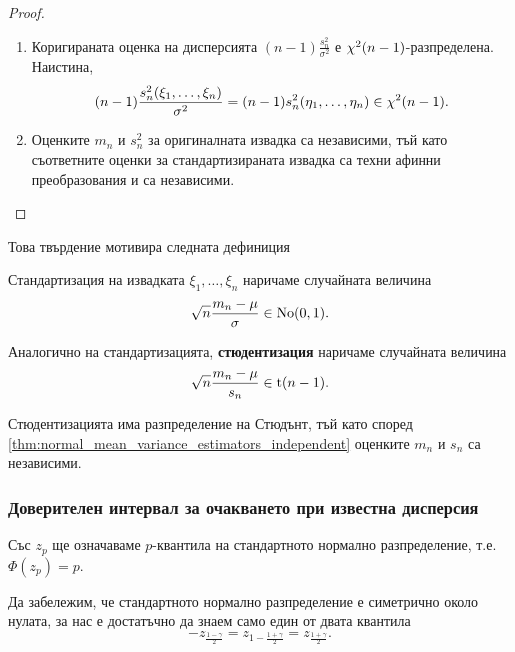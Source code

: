 \documentclass[
  numbers=endperiod,
  headings=standardclasses,
  bibliography=totocnumbered,
]{scrartcl}
\begin{document}
\begin{proof}
\begin{enumerate}
    \item Коригираната оценка на дисперсията \( (n-1) \frac {s_n^2} {\sigma^2} \) е \( \chi^2(n-1) \)-разпределена. Наистина,
    \begin{equation*}
      (n-1) \frac {s_n^2(\xi_1, \ldots, \xi_n)} {\sigma^2}
      =
      (n-1) s_n^2(\eta_1, \ldots, \eta_n)
      \in
      \chi^2(n - 1).
    \end{equation*}

    \item Оценките \( m_n \) и \( s_n^2 \) за оригиналната извадка са независими, тъй като съответните оценки за стандартизираната извадка са техни афинни преобразования и са независими.
  \end{enumerate}
\end{proof}

Това твърдение мотивира следната дефиниция
\begin{definition}
  Стандартизация на извадката \( \xi_1, \ldots, \xi_n \) наричаме случайната величина
  \begin{equation*}
    \sqrt n \frac {m_n - \mu} \sigma \in \operatorname{No}(0, 1).
  \end{equation*}

  Аналогично на стандартизацията, \textbf{стюдентизация} наричаме случайната величина
  \begin{equation*}
    \sqrt n \frac {m_n - \mu} {s_n} \in \operatorname{t}(n - 1).
  \end{equation*}
\end{definition}

\begin{remark}
  Стюдентизацията има разпределение на Стюдънт, тъй като според \cref{thm:normal_mean_variance_estimators_independent} оценките \( m_n \) и \( s_n \) са независими.
\end{remark}

\subsubsection{Доверителен интервал за очакването при известна дисперсия}

Със \( z_p \) ще означаваме \( p \)-квантила на стандартното нормално разпределение, т.е. \( \Phi(z_p) = p \).

Да забележим, че стандартното нормално разпределение е симетрично около нулата, за нас е достатъчно да знаем само един от двата квантила
\begin{equation*}
  -z_{\frac {1-\gamma} 2}
  =
  z_{1-\frac {1+\gamma} 2}
  =
  z_{\frac {1+\gamma} 2}.
\end{equation*}
\end{document}
